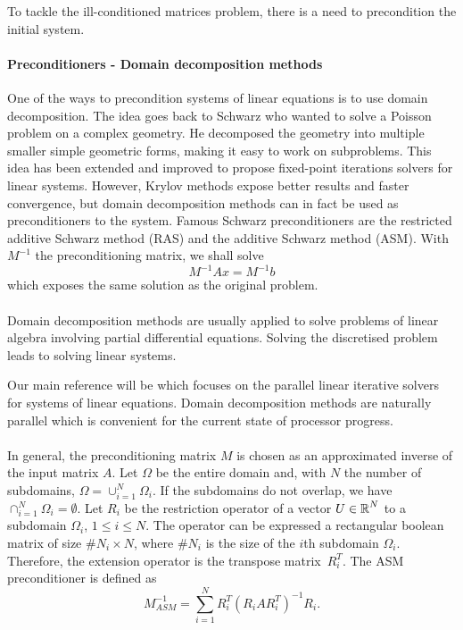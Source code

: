 To tackle the ill-conditioned matrices problem, there is a need to precondition the initial system.


\paragraph{Preconditioners - Domain decomposition methods}
One of the ways to precondition systems of linear equations is to use domain decomposition.
The idea goes back to Schwarz who wanted to solve a Poisson problem on a complex geometry.
He decomposed the geometry into multiple smaller simple geometric forms, making it easy to work on subproblems.
This idea has been extended and improved to propose fixed-point iterations solvers for linear systems.
However, Krylov methods expose better results and faster convergence, but domain decomposition methods can in fact be used as preconditioners to the system.
Famous Schwarz preconditioners are the restricted additive Schwarz method (RAS) and the additive Schwarz method (ASM).
With \(M^{-1}\) the preconditioning matrix, we shall solve
\[M^{-1}Ax = M^{-1}b\]
which exposes the same solution as the original problem.

\paragraph{}
Domain decomposition methods are usually applied to solve problems of linear algebra involving partial differential equations.
Solving the discretised problem leads to solving linear systems.

Our main reference will be \cite{dolean_domain_2015} which focuses on the parallel linear iterative solvers for systems of linear equations.
Domain decomposition methods are naturally parallel which is convenient for the current state of processor progress.

\paragraph{}
In general, the preconditioning matrix \(M\) is chosen as an approximated inverse of the input matrix \(A\).
Let \(\Omega\) be the entire domain and, with \(N\) the number of subdomains, \(\Omega = \cup^N_{i=1} \Omega_i\).
If the subdomains do not overlap, we have \(\cap^N_{i=1} \Omega_i = \emptyset\).
Let \(R_i\) be the restriction operator of a vector \(U \in \operatorname{\mathbb{R}}^N\) to a subdomain \(\Omega_i\), \(1 \le i \le N\).
The operator can be expressed a rectangular boolean matrix of size \(\#N_i \times N\), where \(\#N_i\) is the size of the \(i\)th subdomain \(\Omega_i\).
Therefore, the extension operator is the transpose matrix \(R_i^T\).
The ASM preconditioner is defined as
\[M^{-1}_{ASM} = \sum^N_{i=1} R_i^T (R_i A R_i^T)^{-1} R_i.\]

